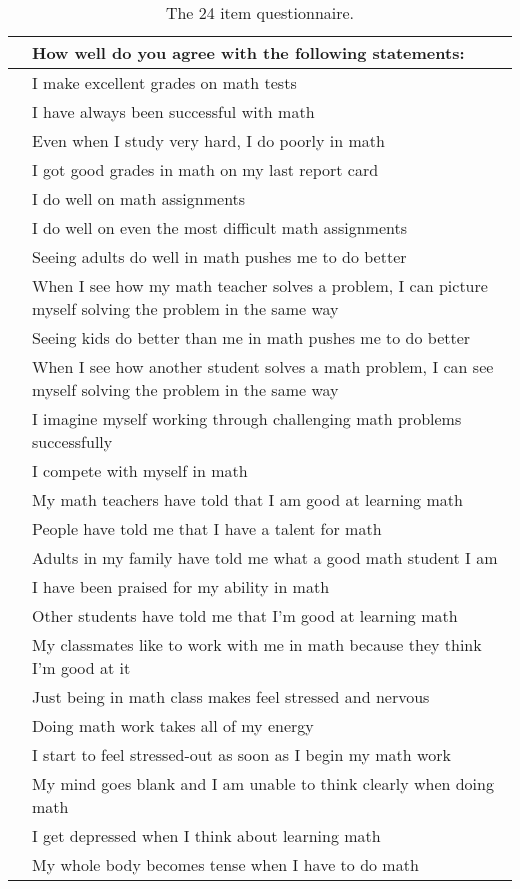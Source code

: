 \documentclass[a4paper,12pt,oneside]{book}
\begin{document}
\begin{table}[!htbp]
	\caption{The 24 item questionnaire.} \label{table:factorsurvey}
	\centering
	\begin{tabular}{l|p{}|}
	\hline
	{} & {How well do you agree with the following statements:} \\
	\hline
	\multirow{6}{*}{\rotatebox[origin=c]{90}{Mastery experience}} & I make excellent grades on math tests \\
	& I have always been successful with math \\
	& Even when I study very hard, I do poorly in math \\
	& I got good grades in math on my last report card \\
	& I do well on math assignments \\
	& I do well on even the most difficult math assignments \\
	\hline
	\multirow{6}{*}{\rotatebox[origin=c]{90}{Vicarious experience}} & Seeing adults do well in math pushes me to do better \\ 
	& When I see how my math teacher solves a problem, I can picture myself solving the problem in the same way \\ 
	& Seeing kids do better than me in math pushes me to do better \\ 
	& When I see how another student solves a math problem, I can see myself solving the problem in the same way \\
	& I imagine myself working through challenging math problems successfully \\
	& I compete with myself in math \\
	\hline
	\multirow{6}{*}{\rotatebox[origin=c]{90}{Social persuasion}} & My math teachers have told that I am good at learning math \\ 
	& People have told me that I have a talent for math \\ 
	& Adults in my family have told me what a good math student I am \\
	& I have been praised for my ability in math \\ 
	& Other students have told me that I’m good at learning math \\ 
	& My classmates like to work with me in math because they think I’m good at it \\ 
	\hline
	\multirow{6}{*}{\rotatebox[origin=c]{90}{Physiological state}}& Just being in math class makes feel stressed and nervous \\ 
	& Doing math work takes all of my energy \\ 
	& I start to feel stressed-out as soon as I begin my math work \\ 
	& My mind goes blank and I am unable to think clearly when doing math \\
	& I get depressed when I think about learning math \\ 
	& My whole body becomes tense when I have to do math \\
	\hline
	\end{tabular}
\end{table}
\end{document}
